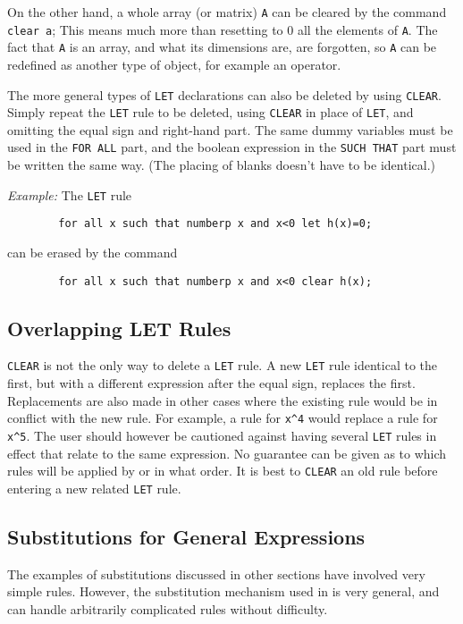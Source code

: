 On the other hand, a whole array (or matrix) \texttt{A} can be cleared by the
command \texttt{clear a};  This means much more than resetting to 0 all the
elements of \texttt{A}.  The fact that \texttt{A} is an array, and what its
dimensions are, are forgotten, so \texttt{A} can be redefined as another type
of object, for example an operator.

The more general types of \texttt{LET} declarations can also be deleted by
using \texttt{CLEAR}.  Simply repeat the \texttt{LET} rule to be deleted, using
\texttt{CLEAR} in place of \texttt{LET}, and omitting the equal sign and
right-hand part.  The same dummy variables must be used in the {\tt FOR
ALL} part, and the boolean expression in the \texttt{SUCH THAT} part must be
written the same way. (The placing of blanks doesn't have to be
identical.)

\textit{Example:} The \texttt{LET} rule
\begin{verbatim}
        for all x such that numberp x and x<0 let h(x)=0;
\end{verbatim}
can be erased by the command
\begin{verbatim}
        for all x such that numberp x and x<0 clear h(x);
\end{verbatim}

\subsection{Overlapping LET Rules}
\texttt{CLEAR} is not the only way to delete a \texttt{LET} rule.  A new 
\texttt{LET} rule identical to the first, but with a different expression after
the equal sign, replaces the first.  Replacements are also made in other
cases where the existing rule would be in conflict with the new rule.  For
example, a rule for \texttt{x\textasciicircum 4} would replace a rule for 
\texttt{x\textasciicircum 5}.
The user should however be cautioned against having several \texttt{LET}
rules in effect that relate to the same expression.  No guarantee can be
given as to which rules will be applied by {\REDUCE} or in what order.  It
is best to \texttt{CLEAR} an old rule before entering a new related 
\texttt{LET} rule.

\subsection{Substitutions for General Expressions}
\label{sec-gensubs}
The examples of substitutions discussed in other sections have involved
very simple rules. However, the substitution mechanism used in {\REDUCE} is
very general, and can handle arbitrarily complicated rules without
difficulty.

